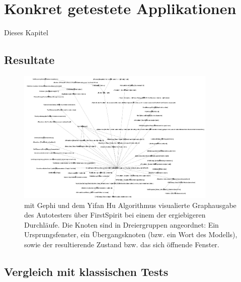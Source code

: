 \chapter{Konkret getestete Applikationen}\label{chapter:concretetests}


Dieses Kapitel


\section{Resultate}\label{section:testresults}

\begin{figure}
	\centering
	\includegraphics[width=0.85\textwidth]{bilder/model_freespirit.png}
	\caption{mit Gephi \cite{website:gephi} und dem Yifan Hu Algorithmus \cite{hu2005efficient} visualierte Graphausgabe 
	des Autotesters über FirstSpirit bei einem der ergiebigeren Durchläufe.
	Die Knoten sind in Dreiergruppen angeordnet: Ein Ursprungsfenster, ein Übergangsknoten (bzw. ein Wort des Modells), 
	sowie der resultierende Zustand bzw. das sich öffnende Fenster.}
	\label{fig:model_freespirit_06.10.2015}
\end{figure}


\section{Vergleich mit klassischen Tests}\label{section:testcomparisonclassic}


